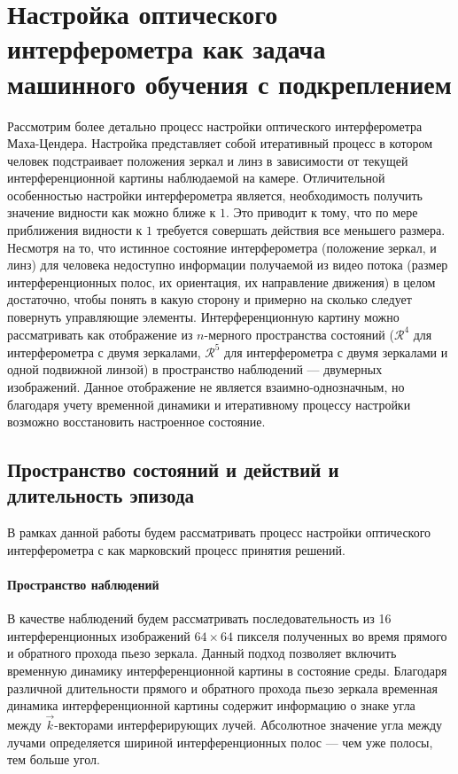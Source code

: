 \section{Настройка оптического интерферометра как задача машинного обучения с подкреплением}\label{sec:ch2/sect2}

Рассмотрим более детально процесс настройки оптического интерферометра Маха-Цендера. Настройка представляет собой итеративный процесс в котором человек подстраивает положения зеркал и линз в зависимости от текущей интерференционной картины наблюдаемой на камере. Отличительной особенностью настройки интерферометра является, необходимость получить значение видности как можно ближе к $1$. Это приводит к тому, что по мере приближения видности к $1$ требуется совершать действия все меньшего размера. Несмотря на то, что истинное состояние интерферометра (положение зеркал, и линз) для человека недоступно информации получаемой из видео потока (размер интерференционных полос, их ориентация, их направление движения) в целом достаточно, чтобы понять в какую сторону и примерно на сколько следует повернуть управляющие элементы. Интерференционную картину можно рассматривать как отображение из $n$-мерного пространства состояний ($\mathcal{R}^4$ для интерферометра с двумя зеркалами, $\mathcal{R}^5$ для интерферометра с двумя зеркалами и одной подвижной линзой) в пространство наблюдений --- двумерных изображений. Данное отображение не является взаимно-однозначным, но благодаря учету временной динамики и итеративному процессу настройки возможно восстановить настроенное состояние. 


\subsection{Пространство состояний и действий и длительность эпизода}

В рамках данной работы будем рассматривать процесс настройки оптического интерферометра с как марковский процесс принятия решений. 

\paragraph{Пространство наблюдений}
В качестве наблюдений будем рассматривать последовательность из 16 интерференционных изображений $64\times64$ пикселя полученных во время прямого и обратного прохода пьезо зеркала. Данный подход позволяет включить временную динамику интерференционной картины в состояние среды. Благодаря различной длительности прямого и обратного прохода пьезо зеркала временная динамика интерференционной картины содержит информацию о знаке угла между $\vec{k}$-векторами интерферирующих лучей. Абсолютное значение угла между лучами определяется шириной интерференционных полос --- чем уже полосы, тем больше угол.

